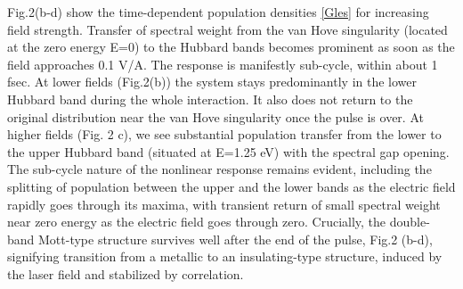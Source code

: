 \documentclass[prb,aps,twocolumn,showpacs,amsmath,amssymb]{revtex4}%
\begin{document}
Fig.2(b-d) show the time-dependent population
densities \ref{Gles} for increasing field
strength.  Transfer of spectral weight from the van Hove singularity 
(located at the zero energy E=0) to 
the Hubbard bands becomes prominent 
as soon as the field approaches 0.1 V/A. 
The response is manifestly 
sub-cycle, within about 1 fsec. 
At lower fields (Fig.2(b)) the system stays predominantly 
in the lower Hubbard band during the whole interaction. 
It also does not return to the original distribution near the 
van Hove singularity once the pulse is over.
At higher fields (Fig. 2 c), 
we see substantial population transfer from the lower 
to the upper Hubbard band (situated at E=1.25 eV) 
with the spectral gap opening. 
The sub-cycle nature of the nonlinear response remains evident, 
including the splitting 
of population between the upper and the lower bands 
as the electric field rapidly goes through its maxima, with transient return of small spectral weight near zero energy as the electric field goes through zero. 
Crucially, the double-band Mott-type structure
survives well after the end of the pulse, 
Fig.2 (b-d), signifying 
transition from a metallic to an insulating-type structure, 
induced by the laser field and stabilized by correlation.
\end{document}
